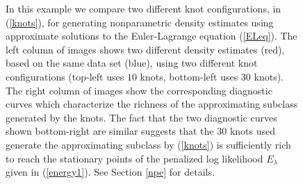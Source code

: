 \documentclass[noinfoline]{imsart}
\begin{document}
\begin{figure}[t]
\caption{In this example we compare two different knot configurations, in (\ref{knots}), for generating nonparametric density estimates using approximate solutions to the  Euler-Lagrange equation (\ref{ELeq}). The left column of images shows two different density estimates (red), based on the same data set (blue), using two different knot configurations (top-left uses $10$ knots, bottom-left uses $30$ knots). The right column of images show the corresponding  diagnostic curves which characterize the richness of the approximating subclass generated by the knots. The fact that the two diagnostic curves shown bottom-right are similar suggests that the $30$ knots used generate the approximating subclass by (\ref{knots}) is sufficiently rich to reach the stationary points of the penalized log likelihood $E_\lambda$ given in (\ref{energy1}).
See Section \ref{npe} for details.
 \label{f2}   
 }
\end{figure}
\end{document}
